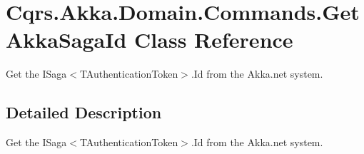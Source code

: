 \hypertarget{classCqrs_1_1Akka_1_1Domain_1_1Commands_1_1GetAkkaSagaId}{}\section{Cqrs.\+Akka.\+Domain.\+Commands.\+Get\+Akka\+Saga\+Id Class Reference}
\label{classCqrs_1_1Akka_1_1Domain_1_1Commands_1_1GetAkkaSagaId}


Get the I\+Saga$<$\+T\+Authentication\+Token$>$.\+Id from the Akka.\+net system.  




\subsection{Detailed Description}
Get the I\+Saga$<$\+T\+Authentication\+Token$>$.\+Id from the Akka.\+net system. 

